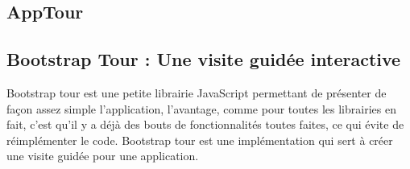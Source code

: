 \documentclass[a4paper]{article}
\begin{document}
\subsection{AppTour}     

\subsection{Bootstrap Tour : Une visite guidée interactive}
 
Bootstrap tour est une petite librairie JavaScript permettant de présenter de façon assez simple l’application, l’avantage, comme pour toutes les librairies en fait, c’est qu’il y a déjà des bouts de fonctionnalités toutes faites, ce qui évite de réimplémenter le code. Bootstrap tour est une implémentation qui sert à créer une visite guidée pour une application. 
\end{document}
